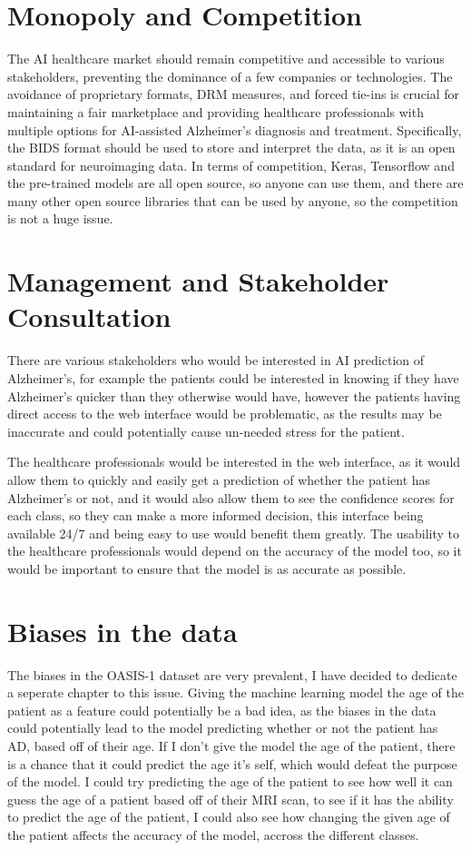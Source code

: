 \documentclass[]{final_report}
\begin{document}
\section{Monopoly and Competition}

The AI healthcare market should remain competitive and accessible to various stakeholders, preventing the dominance of a few companies or technologies. The avoidance of proprietary formats, DRM measures, and forced tie-ins is crucial for maintaining a fair marketplace and providing healthcare professionals with multiple options for AI-assisted Alzheimer's diagnosis and treatment. Specifically, the BIDS format should be used to store and interpret the data, as it is an open standard for neuroimaging data. In terms of competition, Keras, Tensorflow and the pre-trained models are all open source, so anyone can use them, and there are many other open source libraries that can be used by anyone, so the competition is not a huge issue.

\section{Management and Stakeholder Consultation}

There are various stakeholders who would be interested in AI prediction of Alzheimer's, for example the patients could be interested in knowing if they have Alzheimer's quicker than they otherwise would have, however the patients having direct access to the web interface would be problematic, as the results may be inaccurate and could potentially cause un-needed stress for the patient.

The healthcare professionals would be interested in the web interface, as it would allow them to quickly and easily get a prediction of whether the patient has Alzheimer's or not, and it would also allow them to see the confidence scores for each class, so they can make a more informed decision, this interface being available 24/7 and being easy to use would benefit them greatly. The usability to the healthcare professionals would depend on the accuracy of the model too, so it would be important to ensure that the model is as accurate as possible.

\section{Biases in the data}

The biases in the OASIS-1 dataset are very prevalent, I have decided to dedicate a seperate chapter to this issue. Giving the machine learning model the age of the patient as a feature could potentially be a bad idea, as the biases in the data could potentially lead to the model predicting whether or not the patient has AD, based off of their age. If I don't give the model the age of the patient, there is a chance that it could predict the age it's self, which would defeat the purpose of the model. I could try predicting the age of the patient to see how well it can guess the age of a patient based off of their MRI scan, to see if it has the ability to predict the age of the patient, I could also see how changing the given age of the patient affects the accuracy of the model, accross the different classes.
\end{document}
